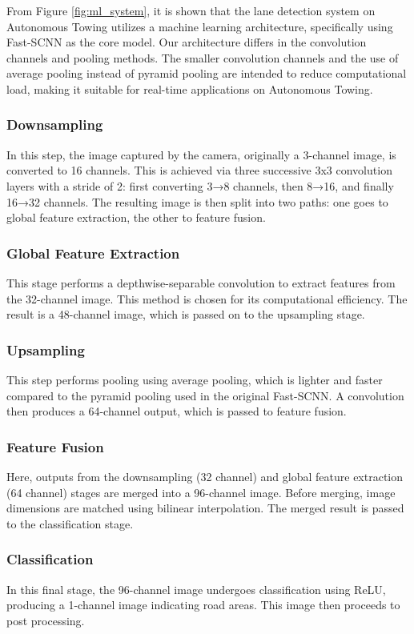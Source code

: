 \documentclass[conference, a4paper]{IEEEtran}[2015/08/26]
\begin{document}
From Figure \ref{fig:ml_system}, it is shown that the lane detection system on Autonomous Towing utilizes a machine learning architecture, specifically using Fast-SCNN \cite{ref_fast_scnn} as the core model. Our architecture differs in the convolution channels and pooling methods. The smaller convolution channels and the use of average pooling instead of pyramid pooling are intended to reduce computational load, making it suitable for real-time applications on Autonomous Towing.

\subsubsection{Downsampling} 
In this step, the image captured by the camera, originally a 3-channel image, is converted to 16 channels. This is achieved via three successive 3x3 convolution layers with a stride of 2: first converting 3→8 channels, then 8→16, and finally 16→32 channels. The resulting image is then split into two paths: one goes to global feature extraction, the other to feature fusion. 

\subsubsection{Global Feature Extraction}
This stage performs a depthwise-separable convolution to extract features from the 32-channel image. This method is chosen for its computational efficiency. The result is a 48-channel image, which is passed on to the upsampling stage. 

\subsubsection{Upsampling}
This step performs pooling using average pooling, which is lighter and faster compared to the pyramid pooling used in the original Fast-SCNN. A convolution then produces a 64-channel output, which is passed to feature fusion.

\subsubsection{Feature Fusion}
Here, outputs from the downsampling (32 channel) and global feature extraction (64 channel) stages are merged into a 96-channel image. Before merging, image dimensions are matched using bilinear interpolation. The merged result is passed to the classification stage.

\subsubsection{Classification}
In this final stage, the 96-channel image undergoes classification using ReLU, producing a 1-channel image indicating road areas. This image then proceeds to post processing.
\end{document}
